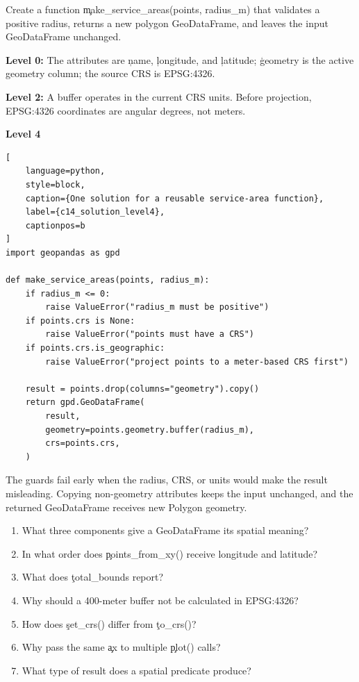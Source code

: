
Create a function \c{make_service_areas(points, radius_m)} that validates a
positive radius, returns a new polygon GeoDataFrame, and leaves the input
GeoDataFrame unchanged.


\textbf{Level 0:} The attributes are \c{name}, \c{longitude}, and \c{latitude};
\c{geometry} is the active geometry column; the source CRS is EPSG:4326.

\textbf{Level 2:} A buffer operates in the current CRS units. Before projection,
EPSG:4326 coordinates are angular degrees, not meters.

\textbf{Level 4}

\begin{lstlisting}[
    language=python,
    style=block,
    caption={One solution for a reusable service-area function},
    label={c14_solution_level4},
    captionpos=b
]
import geopandas as gpd

def make_service_areas(points, radius_m):
    if radius_m <= 0:
        raise ValueError("radius_m must be positive")
    if points.crs is None:
        raise ValueError("points must have a CRS")
    if points.crs.is_geographic:
        raise ValueError("project points to a meter-based CRS first")

    result = points.drop(columns="geometry").copy()
    return gpd.GeoDataFrame(
        result,
        geometry=points.geometry.buffer(radius_m),
        crs=points.crs,
    )
\end{lstlisting}

The guards fail early when the radius, CRS, or units would make the result
misleading. Copying non-geometry attributes keeps the input unchanged, and the
returned GeoDataFrame receives new Polygon geometry.


\begin{enumerate}
    \item What three components give a GeoDataFrame its spatial meaning?
    \item In what order does \c{points_from_xy()} receive longitude and latitude?
    \item What does \c{total_bounds} report?
    \item Why should a 400-meter buffer not be calculated in EPSG:4326?
    \item How does \c{set_crs()} differ from \c{to_crs()}?
    \item Why pass the same \c{ax} to multiple \c{plot()} calls?
    \item What type of result does a spatial predicate produce?
\end{enumerate}

